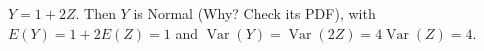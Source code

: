 

\setcounter{theorem}{18}
\begin{exercise}[BH.5.19] 
\begin{solution} 
    $Y=1+2 Z$. Then $Y$ is Normal (Why? Check its PDF), with $E(Y)=1+2 E(Z)=1$ and $\operatorname{Var}(Y)=\operatorname{Var}(2 Z)=4 \operatorname{Var}(Z)=4$.
\end{solution}
\end{exercise}


